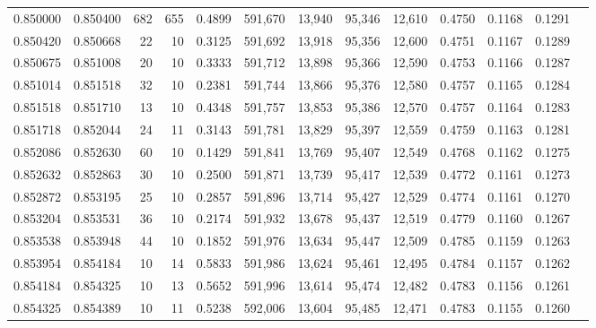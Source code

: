 \begin{tabular}{rrrrrrrrrrrrr}
0.850000 & 0.850400 &   682 & 655 &                                     0.4899 & 591,670 &  13,940 &  95,346 &  12,610 & 0.4750 & 0.1168 & 0.1291 \\
0.850420 & 0.850668 &    22 &  10 &                                     0.3125 & 591,692 &  13,918 &  95,356 &  12,600 & 0.4751 & 0.1167 & 0.1289 \\
0.850675 & 0.851008 &    20 &  10 &                                     0.3333 & 591,712 &  13,898 &  95,366 &  12,590 & 0.4753 & 0.1166 & 0.1287 \\
0.851014 & 0.851518 &    32 &  10 &                                     0.2381 & 591,744 &  13,866 &  95,376 &  12,580 & 0.4757 & 0.1165 & 0.1284 \\
0.851518 & 0.851710 &    13 &  10 &                                     0.4348 & 591,757 &  13,853 &  95,386 &  12,570 & 0.4757 & 0.1164 & 0.1283 \\
0.851718 & 0.852044 &    24 &  11 &                                     0.3143 & 591,781 &  13,829 &  95,397 &  12,559 & 0.4759 & 0.1163 & 0.1281 \\
0.852086 & 0.852630 &    60 &  10 &                                     0.1429 & 591,841 &  13,769 &  95,407 &  12,549 & 0.4768 & 0.1162 & 0.1275 \\
0.852632 & 0.852863 &    30 &  10 &                                     0.2500 & 591,871 &  13,739 &  95,417 &  12,539 & 0.4772 & 0.1161 & 0.1273 \\
0.852872 & 0.853195 &    25 &  10 &                                     0.2857 & 591,896 &  13,714 &  95,427 &  12,529 & 0.4774 & 0.1161 & 0.1270 \\
0.853204 & 0.853531 &    36 &  10 &                                     0.2174 & 591,932 &  13,678 &  95,437 &  12,519 & 0.4779 & 0.1160 & 0.1267 \\
0.853538 & 0.853948 &    44 &  10 &                                     0.1852 & 591,976 &  13,634 &  95,447 &  12,509 & 0.4785 & 0.1159 & 0.1263 \\
0.853954 & 0.854184 &    10 &  14 &                                     0.5833 & 591,986 &  13,624 &  95,461 &  12,495 & 0.4784 & 0.1157 & 0.1262 \\
0.854184 & 0.854325 &    10 &  13 &                                     0.5652 & 591,996 &  13,614 &  95,474 &  12,482 & 0.4783 & 0.1156 & 0.1261 \\
0.854325 & 0.854389 &    10 &  11 &                                     0.5238 & 592,006 &  13,604 &  95,485 &  12,471 & 0.4783 & 0.1155 & 0.1260 \\

\end{tabular}
